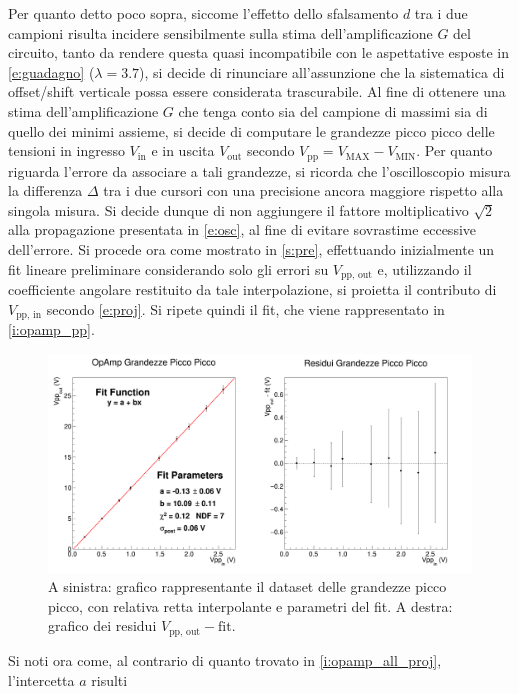 \documentclass[a4paper,11pt]{article} %
\begin{document}
\noindent Per quanto detto poco sopra, siccome l'effetto dello sfalsamento $d$ tra i due campioni risulta incidere
sensibilmente sulla stima dell'amplificazione $G$ del circuito, tanto da rendere questa quasi incompatibile con le
aspettative esposte in \autoref{e:guadagno} ($\lambda = 3.7$), si decide di rinunciare all'assunzione che la sistematica
di offset/shift verticale possa essere considerata trascurabile. Al fine di ottenere una stima dell'amplificazione $G$
che tenga conto sia del campione di massimi sia di quello dei minimi assieme, si decide di computare le grandezze picco
picco delle tensioni in ingresso $V_{\text{in}}$ e in uscita $V_{\text{out}}$ secondo
$V_{\text{pp}}=V_{\text{MAX}}-V_{\text{MIN}}$. Per quanto riguarda l'errore da associare a tali grandezze, si ricorda
che l'oscilloscopio misura la differenza $\Delta$ tra i due cursori con una precisione ancora maggiore rispetto alla
singola misura. Si decide dunque di non aggiungere il fattore moltiplicativo $\sqrt{2}$ alla propagazione presentata in
\autoref{e:osc}, al fine di evitare sovrastime eccessive dell'errore. Si procede ora come mostrato in \autoref{s:pre},
effettuando inizialmente un fit lineare preliminare considerando solo gli errori su $V_{\text{pp, out}}$ e, utilizzando
il coefficiente angolare restituito da tale interpolazione, si proietta il contributo di $V_{\text{pp, in}}$  secondo
\autoref{e:proj}. Si ripete quindi il fit, che viene rappresentato in \autoref{i:opamp_pp}.
\begin{figure}[H]
	\centering
	\includegraphics[width=15cm]{../Plots/Report_Plots/opamp_plot_pp_projected.png}
	\caption{\small A sinistra: grafico rappresentante il dataset delle grandezze picco picco, 
	con relativa retta interpolante e parametri del fit. A destra: grafico dei residui $V_{\text{pp, out}}-\text{fit}$.}
	\label{i:opamp_pp}
\end{figure}
\noindent Si noti ora come, al contrario di quanto trovato in \autoref{i:opamp_all_proj}, l'intercetta $a$ risulti
\end{document}
